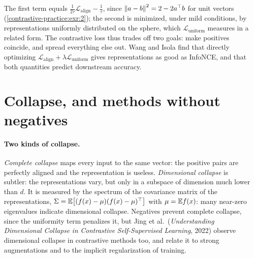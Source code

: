 \begin{notechapter}
The first term equals $\frac1{2\tau}\mathcal L_{\mathrm{align}} - \frac1\tau$, since $\left\|a - b\right\|^2 = 2 - 2a^\top b$ for unit vectors
(\cref{contrastive-practice:exr:2}); the second is minimized, under mild conditions, by representations
uniformly distributed on the sphere, which $\mathcal L_{\mathrm{uniform}}$ measures in a related form. The contrastive loss thus
trades off two goals: make positives coincide, and spread everything else out. Wang and Isola
find that directly optimizing $\mathcal L_{\mathrm{align}} + \lambda\mathcal L_{\mathrm{uniform}}$ gives representations as good as InfoNCE, and that
both quantities predict downstream accuracy.

\section{Collapse, and methods without negatives}\label{contrastive-practice:sec:collapse}

\paragraph{Two kinds of collapse.} \emph{Complete collapse} maps every input to the same vector: the
positive pairs are perfectly aligned and the representation is useless. \emph{Dimensional
collapse} is subtler: the representations vary, but only in a subspace of dimension much lower
than $d$. It is measured by the spectrum of the covariance matrix of the representations,
$\Sigma = \mathbb{E}\bigl[(f(x) - \mu)(f(x) - \mu)^\top\bigr]$ with $\mu = \mathbb{E} f(x)$: many near-zero eigenvalues indicate dimensional collapse. Negatives
prevent complete collapse, since the uniformity term penalizes it, but Jing et al.\
(\emph{Understanding Dimensional Collapse in Contrastive Self-Supervised Learning}, 2022)
observe dimensional collapse in contrastive methods too, and relate it to strong
augmentations and to the implicit regularization of training.


\end{notechapter}
